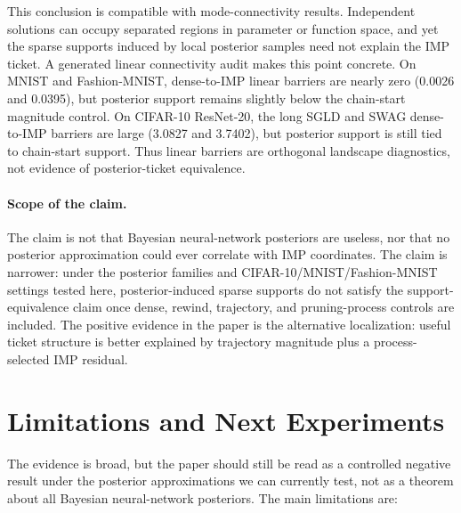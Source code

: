 \documentclass{article}
\begin{document}
This conclusion is compatible with mode-connectivity results. Independent
solutions can occupy separated regions in parameter or function space, and yet
the sparse supports induced by local posterior samples need not explain the IMP
ticket. A generated linear connectivity audit makes this point concrete. On
MNIST and Fashion-MNIST, dense-to-IMP linear barriers are nearly zero (0.0026
and 0.0395), but posterior support remains slightly below the chain-start
magnitude control. On CIFAR-10 ResNet-20, the long SGLD and SWAG dense-to-IMP
barriers are large (3.0827 and 3.7402), but posterior support is still tied to
chain-start support. Thus linear barriers are orthogonal landscape diagnostics,
not evidence of posterior-ticket equivalence.

\paragraph{Scope of the claim.}
The claim is not that Bayesian neural-network posteriors are useless, nor that
no posterior approximation could ever correlate with IMP coordinates. The claim
is narrower: under the posterior families and CIFAR-10/MNIST/Fashion-MNIST
settings tested here, posterior-induced sparse supports do not satisfy the
support-equivalence claim once dense, rewind, trajectory, and pruning-process
controls are included. The positive evidence in the paper is the alternative
localization: useful ticket structure is better explained by trajectory
magnitude plus a process-selected IMP residual.

\section{Limitations and Next Experiments}

The evidence is broad, but the paper should still be read as a controlled
negative result under the posterior approximations we can currently test, not
as a theorem about all Bayesian neural-network posteriors. The main limitations
are:
\end{document}
